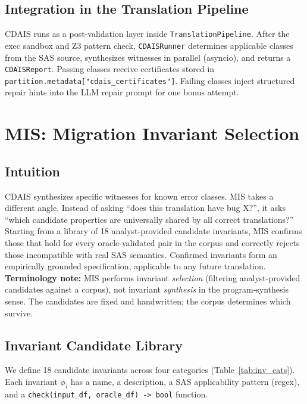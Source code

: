 \documentclass[conference]{IEEEtran}
\begin{document}
\subsection{Integration in the Translation Pipeline}

CDAIS runs as a post-validation layer inside \texttt{TranslationPipeline}. After the
exec sandbox and Z3 pattern check, \texttt{CDAISRunner} determines applicable classes
from the SAS source, synthesizes witnesses in parallel (asyncio), and returns a
\texttt{CDAISReport}. Passing classes receive certificates stored in
\texttt{partition.metadata["cdais\_certificates"]}. Failing classes inject structured
repair hints into the LLM repair prompt for one bonus attempt.


\section{MIS: Migration Invariant Selection}
\label{sec:mis}

\subsection{Intuition}

CDAIS synthesizes specific witnesses for known error classes. MIS takes a different
angle. Instead of asking ``does this translation have bug X?'', it asks ``which
candidate properties are universally shared by all correct translations?'' Starting
from a library of 18 analyst-provided candidate invariants, MIS confirms those that
hold for every oracle-validated pair in the corpus and correctly rejects those
incompatible with real SAS semantics. Confirmed invariants form an empirically
grounded specification, applicable to any future translation. \textbf{Terminology
note:} MIS performs invariant \emph{selection} (filtering analyst-provided candidates
against a corpus), not invariant \emph{synthesis} in the program-synthesis sense.
The candidates are fixed and handwritten; the corpus determines which survive.

\subsection{Invariant Candidate Library}

We define 18 candidate invariants across four categories (Table~\ref{tab:inv_cats}).
Each invariant $\phi_i$ has a name, a description, a SAS applicability pattern
(regex), and a \texttt{check(input\_df, oracle\_df) -> bool} function.
\end{document}
